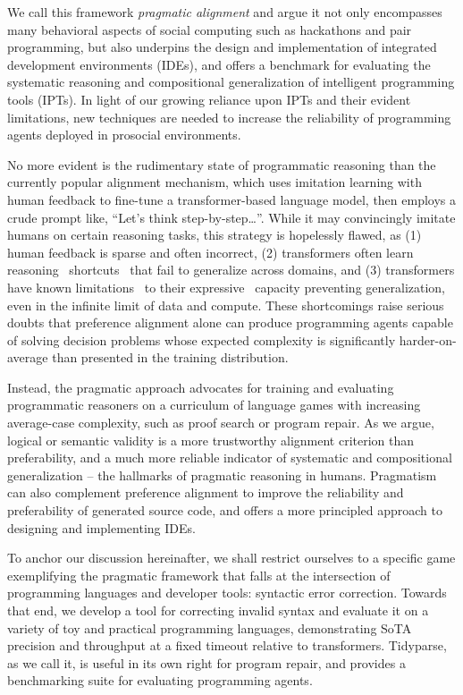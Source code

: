 \documentclass[sigplan,screen]{acmart}
\begin{document}
We call this framework \emph{pragmatic alignment} and argue it not only encompasses many behavioral aspects of social computing such as hackathons and pair programming, but also underpins the design and implementation of integrated development environments (IDEs), and offers a benchmark for evaluating the systematic reasoning and compositional generalization of intelligent programming tools (IPTs). In light of our growing reliance upon IPTs and their evident limitations, new techniques are needed to increase the reliability of programming agents deployed in prosocial environments.

No more evident is the rudimentary state of programmatic reasoning than the currently popular alignment mechanism, which uses imitation learning with human feedback to fine-tune a transformer-based language model, then employs a crude prompt like, ``Let's think step-by-step\ldots''. While it may convincingly imitate humans on certain reasoning tasks, this strategy is hopelessly flawed, as (1) human feedback is sparse and often incorrect, (2) transformers often learn reasoning~\cite{dziri2023faith} shortcuts~\cite{liu2022transformers} that fail to generalize across domains, and (3) transformers have known limitations~\cite{merrill2022saturated} to their expressive~\cite{chiang2023tighter} capacity preventing generalization, even in the infinite limit of data and compute. These shortcomings raise serious doubts that preference alignment alone can produce programming agents capable of solving decision problems whose expected complexity is significantly harder-on-average than presented in the training distribution.

Instead, the pragmatic approach advocates for training and evaluating programmatic reasoners on a curriculum of language games with increasing average-case complexity, such as proof search or program repair. As we argue, logical or semantic validity is a more trustworthy alignment criterion than preferability, and a much more reliable indicator of systematic and compositional generalization -- the hallmarks of pragmatic reasoning in humans. Pragmatism can also complement preference alignment to improve the reliability and preferability of generated source code, and offers a more principled approach to designing and implementing IDEs.

To anchor our discussion hereinafter, we shall restrict ourselves to a specific game exemplifying the pragmatic framework that falls at the intersection of programming languages and developer tools: syntactic error correction. Towards that end, we develop a tool for correcting invalid syntax and evaluate it on a variety of toy and practical programming languages, demonstrating SoTA precision and throughput at a fixed timeout relative to transformers. Tidyparse, as we call it, is useful in its own right for program repair, and provides a benchmarking suite for evaluating programming agents.
\end{document}

